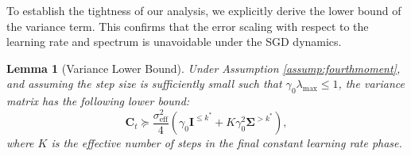 \documentclass{article}
\theoremstyle{definition}
\theoremstyle{definition}
\theoremstyle{plain}
\theoremstyle{plain}
\theoremstyle{plain}
\newtheorem{lemma}{Lemma}
\theoremstyle{plain}
\theoremstyle{plain}
\newcommand{\bs}[1]{\boldsymbol{\mathbf{#1}}}
\newcommand{\eff}{\mathrm{eff}}
\newcommand{\id}{\mathbf{I}}
\begin{document}
To establish the tightness of our analysis, we explicitly derive the lower bound of the variance term. This confirms that the error scaling with respect to the learning rate and spectrum is unavoidable under the SGD dynamics.

\begin{lemma}[Variance Lower Bound]
\label{lem:variance_lower_bound}
    Under Assumption \ref{assump:fourthmoment}, and assuming the step size is sufficiently small such that $\gamma_0 \lambda_{\max} \leq 1$, the variance matrix has the following lower bound:
    \begin{equation}
        \bs C_t \succeq \frac{\sigma_\eff^2}{4} \left( \gamma_0 \id^{\le k^*} +  K \gamma_0^2 \bs\Sigma^{>k^*} \right),
    \end{equation}
    where $K$ is the effective number of steps in the final constant learning rate phase.
\end{lemma}
\end{document}
